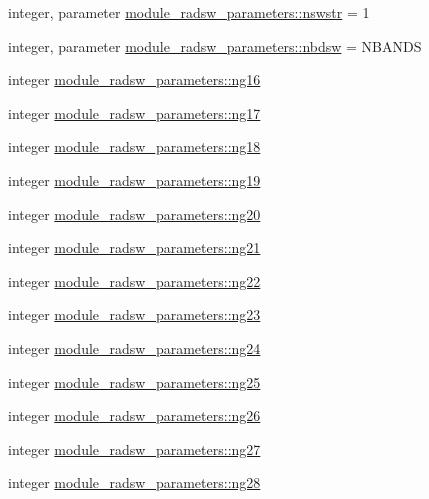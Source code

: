 \begin{DoxyCompactItemize}
integer, parameter \hyperlink{group__module__radsw__main_ga3d4238ce9a40d70a6cdfe241d640ff5f}{module\+\_\+radsw\+\_\+parameters\+::nswstr} = 1
\item 
integer, parameter \hyperlink{group__module__radsw__main_gab1e121fde29dde00871e4a7d43be1ddb}{module\+\_\+radsw\+\_\+parameters\+::nbdsw} = N\+B\+A\+N\+DS
\item 
integer \hyperlink{group__module__radsw__main_ga442b3758f00a388cd8b7129ba910942a}{module\+\_\+radsw\+\_\+parameters\+::ng16}
\item 
integer \hyperlink{group__module__radsw__main_gaf1f90ffe5780463d1e2edbe0e8dfd1f9}{module\+\_\+radsw\+\_\+parameters\+::ng17}
\item 
integer \hyperlink{group__module__radsw__main_gac00a8e59e4f7e584af9b453c2c9fe35d}{module\+\_\+radsw\+\_\+parameters\+::ng18}
\item 
integer \hyperlink{group__module__radsw__main_gab3551e23105cd3515e887e877407dc39}{module\+\_\+radsw\+\_\+parameters\+::ng19}
\item 
integer \hyperlink{group__module__radsw__main_ga1619a2243f1cb29e4393598fa0bc4c8f}{module\+\_\+radsw\+\_\+parameters\+::ng20}
\item 
integer \hyperlink{group__module__radsw__main_gab029caf0ee0c1195539643bef00e0598}{module\+\_\+radsw\+\_\+parameters\+::ng21}
\item 
integer \hyperlink{group__module__radsw__main_ga655c1f742fc97d58c32131e8a85cb6fd}{module\+\_\+radsw\+\_\+parameters\+::ng22}
\item 
integer \hyperlink{group__module__radsw__main_ga0c4f1d2f9438850994bcedb395d07f40}{module\+\_\+radsw\+\_\+parameters\+::ng23}
\item 
integer \hyperlink{group__module__radsw__main_gae25ce9a47816b83c6c57440747f1975f}{module\+\_\+radsw\+\_\+parameters\+::ng24}
\item 
integer \hyperlink{group__module__radsw__main_ga3361783dd00dc40ee9f93c7f428c4e58}{module\+\_\+radsw\+\_\+parameters\+::ng25}
\item 
integer \hyperlink{group__module__radsw__main_gafcc02ded0358f9465eb9987226522266}{module\+\_\+radsw\+\_\+parameters\+::ng26}
\item 
integer \hyperlink{group__module__radsw__main_ga56a6dfca4ad450a5ccc910864780a971}{module\+\_\+radsw\+\_\+parameters\+::ng27}
\item 
integer \hyperlink{group__module__radsw__main_gaa2530abff6c981c3f3e70ef097f90ffc}{module\+\_\+radsw\+\_\+parameters\+::ng28}
\item 

\end{DoxyCompactItemize}
